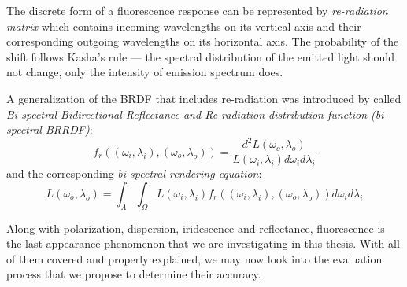 The discrete form of a fluorescence response can be represented by \emph{re-radiation matrix} which contains incoming wavelengths on its vertical axis and their corresponding outgoing wavelengths on its horizontal axis. The probability of the shift follows Kasha's rule --- the spectral distribution of the emitted light should not change, only the intensity of emission spectrum does.

A generalization of the BRDF that includes re-radiation was introduced by \citet{hullin2010acquisition} called \emph{Bi-spectral Bidirectional Reflectance and Re-radiation distribution function (bi-spectral BRRDF)}:
\begin{equation}
f_r((\omega_i,\lambda_i),(\omega_o,\lambda_o))=\frac{d^2L(\omega_o,\lambda_o)}{L(\omega_i,\lambda_i)d\omega_i d\lambda_i}
\end{equation}
and the corresponding \emph{bi-spectral rendering equation}:
\begin{equation}
L(\omega_o,\lambda_o)=\int_{\Lambda}\int_{\Omega}L(\omega_i,\lambda_i)f_r((\omega_i,\lambda_i),(\omega_o,\lambda_o))d\omega_i d\lambda_i
\end{equation}

Along with polarization, dispersion, iridescence and reflectance, fluorescence is the last appearance phenomenon that we are investigating in this thesis. With all of them covered and properly explained, we may now look into the evaluation process that we propose to determine their accuracy.